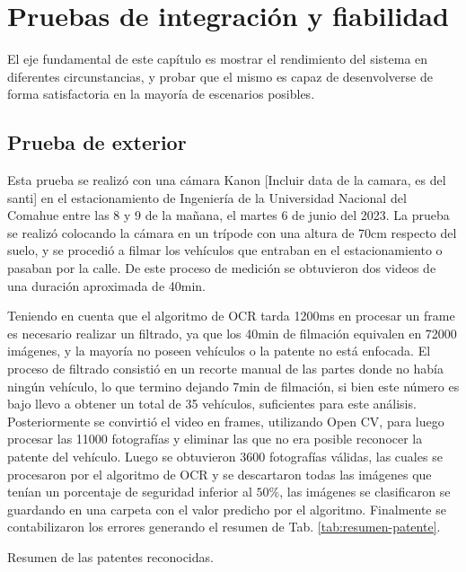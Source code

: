 \chapter{Pruebas de integración y fiabilidad}

El eje fundamental de este capítulo es mostrar el rendimiento del sistema en diferentes circunstancias, y probar que el mismo es capaz de desenvolverse de forma satisfactoria en la mayoría de escenarios posibles.

\section{Prueba de exterior}

Esta prueba se realizó con una cámara Kanon [Incluir data de la camara, es del santi] en el estacionamiento de Ingeniería de la Universidad Nacional del Comahue entre las 8 y 9 de la mañana, el martes 6 de junio del 2023. La prueba se realizó colocando la cámara en un trípode con una altura de 70cm respecto del suelo, y se procedió a filmar los vehículos que entraban en el estacionamiento o pasaban por la calle. De este proceso de medición se obtuvieron dos videos de una duración aproximada de 40min.

Teniendo en cuenta que el algoritmo de OCR tarda 1200ms en procesar un frame es necesario realizar un filtrado, ya que los 40min de filmación equivalen en 72000 imágenes, y la mayoría no poseen vehículos o la patente no está enfocada. El proceso de filtrado consistió en un recorte manual de las partes donde no había ningún vehículo, lo que termino dejando 7min de filmación, si bien este número es bajo llevo a obtener un total de 35 vehículos, suficientes para este análisis. Posteriormente se convirtió el video en frames, utilizando Open CV, para luego procesar las 11000 fotografías y eliminar las que no era posible reconocer la patente del vehículo. Luego se obtuvieron 3600 fotografías válidas, las cuales se procesaron por el algoritmo de OCR y se descartaron todas las imágenes que tenían un porcentaje de seguridad inferior al $50\%$, las imágenes se clasificaron se guardando en una carpeta con el valor predicho por el algoritmo.
Finalmente se contabilizaron los errores generando el resumen de Tab. \ref{tab:resumen-patente}.

\begin{table}
    \centering
    
    \caption{Resumen de las patentes reconocidas.}
    \label{tab:resumen-patente}
\end{table}

